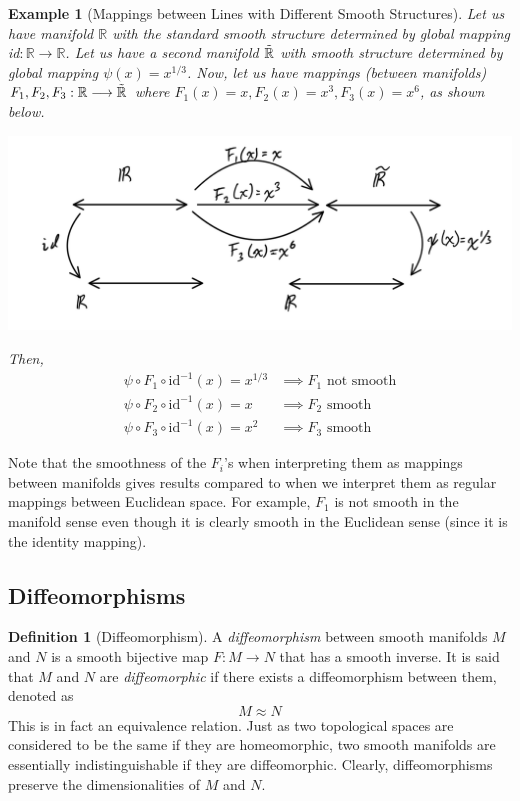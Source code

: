 \documentclass{article}
\newtheorem{example}{Example}[section]
\theoremstyle{remark}
\theoremstyle{definition}
\newtheorem{definition}{Definition}[section]
\begin{document}
\begin{example}[Mappings between Lines with Different Smooth Structures]
Let us have manifold $\mathbb{R}$ with the standard smooth structure determined by global mapping id$: \mathbb{R} \longrightarrow \mathbb{R}$. Let us have a second manifold $\Tilde{\mathbb{R}}$ with smooth structure determined by global mapping $\psi(x) = x^{1/3}$. Now, let us have mappings (between manifolds) $F_1, F_2, F_3: \mathbb{R} \longrightarrow \Tilde{\mathbb{R}}$ where $F_1 (x) = x, F_2 (x) = x^3, F_3(x) = x^6$, as shown below. 
\begin{center}
    \includegraphics[scale=0.25]{img/Real_Line_Manifold_Functions.PNG}
\end{center}
Then,
\begin{align*}
    \psi \circ F_1 \circ \text{id}^{-1} (x)= x^{1/3} & \implies F_1 \text{ not smooth} \\
    \psi \circ F_2 \circ \text{id}^{-1}(x) = x & \implies F_2 \text{ smooth} \\
    \psi \circ F_3 \circ \text{id}^{-1}(x) = x^{2} & \implies F_3 \text{ smooth} 
\end{align*}
\end{example}

Note that the smoothness of the $F_i$'s when interpreting them as mappings between manifolds gives results compared to when we interpret them as regular mappings between Euclidean space. For example, $F_1$ is not smooth in the manifold sense even though it is clearly smooth in the Euclidean sense (since it is the identity mapping).  

\subsection{Diffeomorphisms}
\begin{definition}[Diffeomorphism]
A \textit{diffeomorphism} between smooth manifolds $M$ and $N$ is a smooth bijective map $F: M \longrightarrow N$ that has a smooth inverse. It is said that $M$ and $N$ are \textit{diffeomorphic} if there exists a diffeomorphism between them, denoted as 
\[M \approx N\]
This is in fact an equivalence relation. Just as two topological spaces are considered to be the same if they are homeomorphic, two smooth manifolds are essentially indistinguishable if they are diffeomorphic. Clearly, diffeomorphisms preserve the dimensionalities of $M$ and $N$. 
\end{definition}
\end{document}
